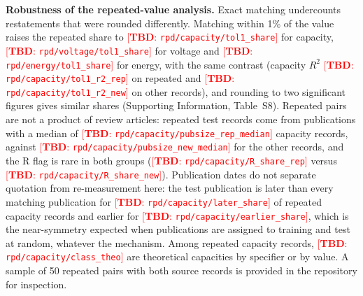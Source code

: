 \documentclass[journal=jcisd8,manuscript=article,layout=traditional]{achemso}
\newcommand{\TBD}[1]{\textcolor{red}{[\textbf{TBD}: \nolinkurl{#1}]}}
\begin{document}
\textbf{Robustness of the repeated-value analysis.} Exact matching undercounts restatements that were rounded differently. Matching within 1\% of the value raises the repeated share to \TBD{rpd/capacity/tol1_share} for capacity, \TBD{rpd/voltage/tol1_share} for voltage and \TBD{rpd/energy/tol1_share} for energy, with the same contrast (capacity $R^2$ \TBD{rpd/capacity/tol1_r2_rep} on repeated and \TBD{rpd/capacity/tol1_r2_new} on other records), and rounding to two significant figures gives similar shares (Supporting Information, Table~S8). Repeated pairs are not a product of review articles: repeated test records come from publications with a median of \TBD{rpd/capacity/pubsize_rep_median} capacity records, against \TBD{rpd/capacity/pubsize_new_median} for the other records, and the R flag is rare in both groups (\TBD{rpd/capacity/R_share_rep} versus \TBD{rpd/capacity/R_share_new}). Publication dates do not separate quotation from re-measurement here: the test publication is later than every matching publication for \TBD{rpd/capacity/later_share} of repeated capacity records and earlier for \TBD{rpd/capacity/earlier_share}, which is the near-symmetry expected when publications are assigned to training and test at random, whatever the mechanism. Among repeated capacity records, \TBD{rpd/capacity/class_theo} are theoretical capacities by specifier or by value. A sample of 50 repeated pairs with both source records is provided in the repository for inspection.
\end{document}
